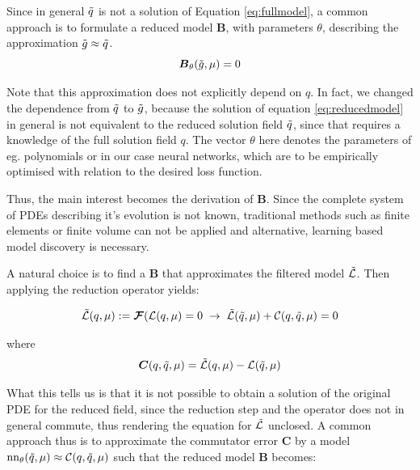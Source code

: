 Since in general $\Tilde{q}$ is not a solution of Equation \ref{eq:fullmodel}, a common approach is to formulate a reduced model $\boldsymbol{B}$, with parameters $\theta$, describing the approximation $\Tilde{g}\approx \Tilde{q}$. 
\begin{equation}
    \label{eq:filteredmodel}
    \boldsymbol{B}_{\theta}(\Tilde{g}, \mu) = 0
\end{equation}

Note that this approximation does not explicitly depend on $q$. In fact, we changed the dependence from $\Tilde{q}$ to $\Tilde{g}$, because the solution of equation \ref{eq:reducedmodel} in general is not equivalent to the reduced solution field $\Tilde{q}$, since that requires a knowledge of the full solution field $q$. The vector $\theta$ here denotes the parameters of eg. polynomials or in our case neural networks, which are to be empirically optimised with relation to the desired loss function.

Thus, the main interest becomes the derivation of $\boldsymbol{B}$. Since the complete system of PDEs describing it's evolution is not known, traditional methods such as finite elements or finite volume can not be applied and alternative, learning based model discovery is necessary.

A natural choice is to find a $\boldsymbol{B}$ that approximates the filtered model $\Tilde{\mathcal{L}}$. Then applying the reduction operator yields:

\begin{equation}
    \label{eq:closure}
    \Tilde{\mathcal{L}}(q, \mu):=\boldsymbol{\mathcal{F}}(\mathcal{L}(q,\mu) = 0 \; \rightarrow \; 
    \Tilde{\mathcal{L}}(\Tilde{q}, \mu) + \mathcal{C}(q,\Tilde{q},\mu) = 0
\end{equation}

where
\begin{equation}
    \label{eq:closuredef}
    \boldsymbol{C}(q,\Tilde{q},\mu) =  \Tilde{\mathcal{L}}(q, \mu) - \mathcal{L}(\Tilde{q},\mu)
\end{equation}

What this tells us is that it is not possible to obtain a solution of the original PDE for the reduced field, since the reduction step and the operator does not in general commute, thus rendering the equation for $\Tilde{\mathcal{L}}$ unclosed. A common approach thus is to approximate the commutator error $\boldsymbol{C}$ by a model $\mathrm{nn}_{\theta}(\Tilde{q},\mu) \approx \mathcal{C}(q,\Tilde{q},\mu)$ such that the reduced model $\boldsymbol{B}$ becomes:

